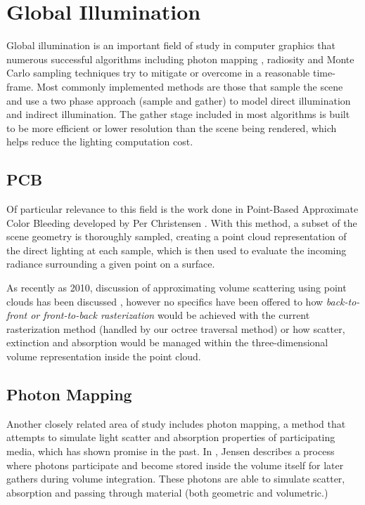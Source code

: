 \documentclass[12pt]{ucthesis}
\begin{document}
\section{Global Illumination}
Global illumination is an important field of study in computer graphics that numerous successful algorithms including photon mapping \cite{Jensen:2009}, radiosity \cite{radiosity} and Monte Carlo sampling techniques \cite{monte_carlo} try to mitigate or overcome in a reasonable time-frame.  Most commonly implemented methods are those that sample the scene and use a two phase approach (sample and gather) to model direct illumination and indirect illumination.  The gather stage included in most algorithms is built to be more efficient or lower resolution than the scene being rendered, which helps reduce the lighting computation cost.

\subsection{PCB}
Of particular relevance to this field is the work done in Point-Based Approximate Color Bleeding developed by Per Christensen \cite{christensen:2008}.  With this method, a subset of the scene geometry is thoroughly sampled, creating a point cloud representation of the direct lighting at each sample, which is then used to evaluate the incoming radiance surrounding a given point on a surface.

As recently as 2010, discussion of approximating volume scattering using point clouds has been discussed \cite{christensen:siggraph}, however no specifics have been offered to how \textit{back-to-front or front-to-back rasterization} would be achieved with the current rasterization method (handled by our octree traversal method) or how scatter, extinction and absorption would be managed within the three-dimensional volume representation inside the point cloud.

\subsection{Photon Mapping}
Another closely related area of study includes photon mapping, a method that attempts to simulate light scatter and absorption properties of participating media, which has shown promise in the past.  In \cite{jensen:1998}, Jensen describes a process where photons participate and become stored inside the volume itself for later gathers during volume integration.  These photons are able to simulate scatter, absorption and passing through material (both geometric and volumetric.)
\end{document}
